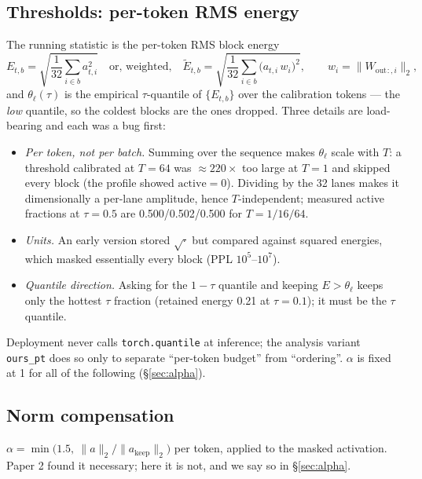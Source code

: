 \documentclass[11pt]{article}
\newcommand{\Wout}{\ensuremath{W_{\mathrm{out}}}}
\newcommand{\thetal}{\theta_\ell}
\newcommand{\code}[1]{\texttt{\small #1}}
\begin{document}
\subsection{Thresholds: per-token RMS energy}\label{sec:thresh}
The running statistic is the per-token RMS block energy
\begin{equation}
E_{t,b}=\sqrt{\frac{1}{32}\sum_{i\in b}a_{t,i}^{2}}
\quad\text{or, weighted,}\quad
\tilde E_{t,b}=\sqrt{\frac{1}{32}\sum_{i\in b}\big(a_{t,i}\,w_i\big)^{2}},
\qquad w_i=\|\Wout{}_{:,i}\|_2 ,
\end{equation}
and $\thetal(\tau)$ is the empirical $\tau$-quantile of $\{E_{t,b}\}$ over the calibration
tokens --- the \emph{low} quantile, so the coldest blocks are the ones dropped. Three
details are load-bearing and each was a bug first:
\begin{itemize}
\item \emph{Per token, not per batch.} Summing over the sequence makes $\thetal$ scale with
$T$: a threshold calibrated at $T{=}64$ was $\approx\!220\times$ too large at $T{=}1$ and
skipped every block (the profile showed $\mathrm{active}=0$). Dividing by the 32 lanes makes
it dimensionally a per-lane amplitude, hence $T$-independent; measured active fractions at
$\tau{=}0.5$ are 0.500/0.502/0.500 for $T{=}1/16/64$.
\item \emph{Units.} An early version stored $\sqrt{\cdot}$ but compared against squared
energies, which masked essentially every block (PPL $10^5$--$10^7$).
\item \emph{Quantile direction.} Asking for the $1-\tau$ quantile and keeping $E>\thetal$
keeps only the hottest $\tau$ fraction (retained energy 0.21 at $\tau{=}0.1$); it must be
the $\tau$ quantile.
\end{itemize}
Deployment never calls \code{torch.quantile} at inference; the analysis variant
\code{ours\_pt} does so only to separate ``per-token budget'' from ``ordering''.
$\alpha$ is fixed at 1 for all of the following (\S\ref{sec:alpha}).

\subsection{Norm compensation}
$\alpha = \min\big(1.5,\ \|a\|_2 / \|a_{\mathrm{keep}}\|_2\big)$ per token, applied to the
masked activation. Paper 2 found it necessary; here it is not, and we say so in
\S\ref{sec:alpha}.
\end{document}
